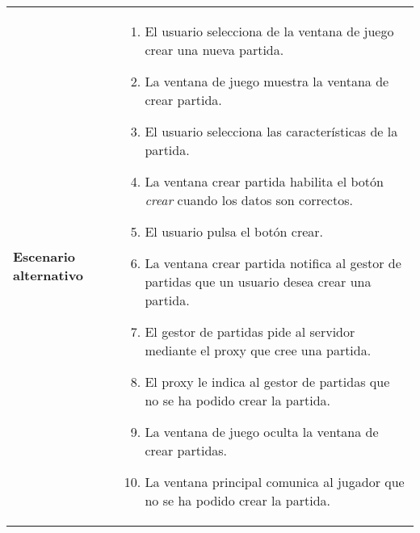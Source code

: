 {\begin{tabularx}{0.95\textwidth}{p{}|X}
\textbf{Escenario alternativo} & \begin{enumerate}
\item El usuario selecciona de la ventana de juego crear una nueva partida.
\item La ventana de juego muestra la ventana de crear partida.
\item El usuario selecciona las características de la partida.
\item La ventana crear partida habilita el botón \emph{crear} cuando los datos
son correctos.
\item El usuario pulsa el botón crear.
\item La ventana crear partida notifica al gestor de partidas que un usuario
desea crear una partida.
\item El gestor de partidas pide al servidor mediante el proxy que cree una
partida.
\item El proxy le indica al gestor de partidas que no se ha podido crear la
partida.
\item La ventana de juego oculta la ventana de crear partidas.
\item La ventana principal comunica al jugador que no se ha podido crear la
partida.
\end{enumerate} \\

\end{tabularx}
}


